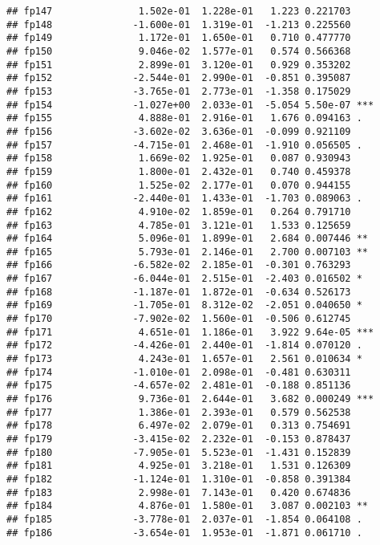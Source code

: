 \documentclass[
]{article}
\begin{document}
\begin{verbatim}
## fp147               1.502e-01  1.228e-01   1.223 0.221703    
## fp148              -1.600e-01  1.319e-01  -1.213 0.225560    
## fp149               1.172e-01  1.650e-01   0.710 0.477770    
## fp150               9.046e-02  1.577e-01   0.574 0.566368    
## fp151               2.899e-01  3.120e-01   0.929 0.353202    
## fp152              -2.544e-01  2.990e-01  -0.851 0.395087    
## fp153              -3.765e-01  2.773e-01  -1.358 0.175029    
## fp154              -1.027e+00  2.033e-01  -5.054 5.50e-07 ***
## fp155               4.888e-01  2.916e-01   1.676 0.094163 .  
## fp156              -3.602e-02  3.636e-01  -0.099 0.921109    
## fp157              -4.715e-01  2.468e-01  -1.910 0.056505 .  
## fp158               1.669e-02  1.925e-01   0.087 0.930943    
## fp159               1.800e-01  2.432e-01   0.740 0.459378    
## fp160               1.525e-02  2.177e-01   0.070 0.944155    
## fp161              -2.440e-01  1.433e-01  -1.703 0.089063 .  
## fp162               4.910e-02  1.859e-01   0.264 0.791710    
## fp163               4.785e-01  3.121e-01   1.533 0.125659    
## fp164               5.096e-01  1.899e-01   2.684 0.007446 ** 
## fp165               5.793e-01  2.146e-01   2.700 0.007103 ** 
## fp166              -6.582e-02  2.185e-01  -0.301 0.763293    
## fp167              -6.044e-01  2.515e-01  -2.403 0.016502 *  
## fp168              -1.187e-01  1.872e-01  -0.634 0.526173    
## fp169              -1.705e-01  8.312e-02  -2.051 0.040650 *  
## fp170              -7.902e-02  1.560e-01  -0.506 0.612745    
## fp171               4.651e-01  1.186e-01   3.922 9.64e-05 ***
## fp172              -4.426e-01  2.440e-01  -1.814 0.070120 .  
## fp173               4.243e-01  1.657e-01   2.561 0.010634 *  
## fp174              -1.010e-01  2.098e-01  -0.481 0.630311    
## fp175              -4.657e-02  2.481e-01  -0.188 0.851136    
## fp176               9.736e-01  2.644e-01   3.682 0.000249 ***
## fp177               1.386e-01  2.393e-01   0.579 0.562538    
## fp178               6.497e-02  2.079e-01   0.313 0.754691    
## fp179              -3.415e-02  2.232e-01  -0.153 0.878437    
## fp180              -7.905e-01  5.523e-01  -1.431 0.152839    
## fp181               4.925e-01  3.218e-01   1.531 0.126309    
## fp182              -1.124e-01  1.310e-01  -0.858 0.391384    
## fp183               2.998e-01  7.143e-01   0.420 0.674836    
## fp184               4.876e-01  1.580e-01   3.087 0.002103 ** 
## fp185              -3.778e-01  2.037e-01  -1.854 0.064108 .  
## fp186              -3.654e-01  1.953e-01  -1.871 0.061710 .  

\end{verbatim}
\end{document}
